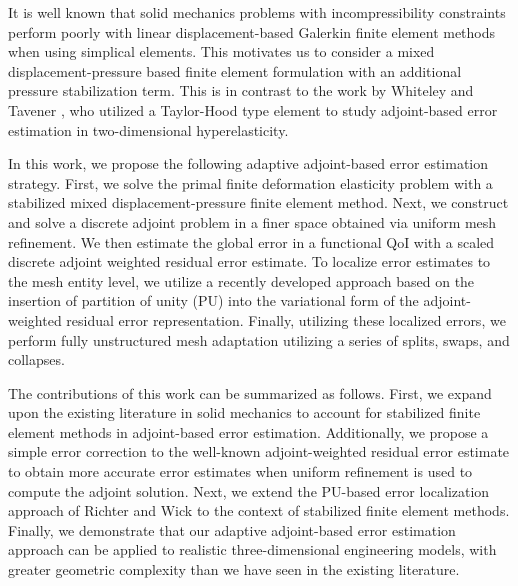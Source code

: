 It is well known that solid mechanics problems with incompressibility
constraints perform poorly with linear displacement-based Galerkin finite
element methods when using simplical elements. This motivates us to consider
a mixed displacement-pressure based finite element formulation with an
additional pressure stabilization term. This is in contrast to the work by
Whiteley and Tavener \cite{whiteley2014error}, who utilized a Taylor-Hood
type element to study adjoint-based error estimation in two-dimensional
hyperelasticity.

In this work, we propose the following adaptive adjoint-based error
estimation strategy. First, we solve the primal finite deformation
elasticity problem with a stabilized mixed displacement-pressure finite
element method. Next, we construct and solve a discrete adjoint problem
in a finer space obtained via uniform mesh refinement. We then estimate
the global error in a functional QoI with a scaled discrete adjoint
weighted residual error estimate. To localize error estimates to the
mesh entity level, we utilize a recently developed approach
\cite{richter2015variational, wick2016goal} based on the insertion of
partition of unity (PU) into the variational form of the adjoint-weighted
residual error representation. Finally, utilizing these localized errors,
we perform fully unstructured mesh adaptation utilizing a series
of splits, swaps, and collapses.

The contributions of this work can be summarized as follows. First,
we expand upon the existing literature in solid mechanics to account for
stabilized finite element methods in adjoint-based error estimation.
Additionally, we propose a simple error correction to the well-known
adjoint-weighted residual \cite{fidkowski2011review} error estimate to obtain
more accurate error estimates when uniform refinement is used to compute the
adjoint solution. Next, we extend the PU-based error localization approach
of Richter and Wick \cite{richter2015variational} to the context of
stabilized finite element methods. Finally, we demonstrate that our adaptive
adjoint-based error estimation approach can be applied to realistic
three-dimensional engineering models, with greater geometric complexity
than we have seen in the existing literature.

